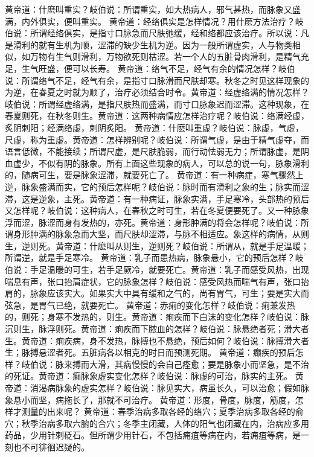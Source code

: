 \documentclass[a4paper,12pt,UTF8,twoside]{ctexbook}
\begin{document}
黄帝道：什麽叫重实？岐伯说：所谓重实，如大热病人，邪气甚热，而脉象又盛满，内外俱实，便叫重实。
黄帝道：经络俱实是怎样情况？用什麽方法治疗？岐伯说：所谓经络俱实，是指寸口脉急而尺肤弛缓，经和络都应该治疗。所以说：凡是滑利的就有生机为顺，涩滞的缺少生机为逆。因为一般所谓虚实，人与物类相似，如万物有生气则滑利，万物欲死则枯涩。若一个人的五脏骨肉滑利，是精气充足，生气旺盛，便可以长寿。
黄帝道：络气不足，经气有余的情况怎样？岐伯说：所谓络气不足，经气有余，是指寸口脉滑而尺肤却寒。秋冬之时见这样现象的为逆，在春夏之时就为顺了，治疗必须结合时令。黄帝道：经虚络满的情况怎样？岐伯说：所谓经虚络满，是指尺肤热而盛满，而寸口脉象迟而涩滞。这种现象，在春夏则死，在秋冬则生。黄帝道：这两种病情应怎样治疗呢？岐伯说：络满经虚，炙阴刺阳；经满络虚，刺阴炙阳。
黄帝道：什麽叫重虚？岐伯说：脉虚，气虚，尺虚，称为重虚。黄帝道：怎样辨别呢？岐伯说：所谓气虚，是由于精气虚夺，而语言低微，不能接续；所谓尺虚，是尺肤脆弱，而行动怯弱无力；所谓脉虚，是阴血虚少，不似有阴的脉象。所有上面这些现象的病人，可以总的说一句，脉象滑利的，随病可生，要是脉象涩滞，就要死亡了。
黄帝道：有一种病症，寒气骤然上逆，脉象盛满而实，它的预后怎样呢？岐伯说：脉时而有滑利之象的生；脉实而涩滞，这是逆象，主死。黄帝道：有一种病证，脉象实满，手足寒冷，头部热的预后又怎样呢？岐伯说：这种病人，在春秋之时可生，若在冬夏便要死了。又一种脉象浮而涩，脉涩而身有发热的，亦死。黄帝道：身形肿满的将会怎样呢？岐伯说：所谓身形肿满的脉象急而大坚，而尺肤却涩滞，与脉不相适应。象这样的病情，从则生，逆则死。黄帝道：什麽叫从则生，逆则死？岐伯说：所谓从，就是手足温暖；所谓逆，就是手足寒冷。
黄帝道：乳子而患热病，脉象悬小，它的预后怎样？岐伯说：手足温暖的可生，若手足厥冷，就要死亡。黄帝道：乳子而感受风热，出现喘息有声，张口抬肩症状，它的脉象怎样？岐伯说：感受风热而喘气有声，张口抬肩的，脉象应该实大。如果实大中具有缓和之气的，尚有胃气，可生；要是实大而弦急，是胃气已绝，就要死亡。
黄帝道：赤痢的变化怎样？岐伯说：痢兼发热的，则死；身寒不发热的，则生。黄帝道：痢疾而下白沫的变化怎样？岐伯说：脉沉则生，脉浮则死。黄帝道：痢疾而下脓血的怎样？岐伯说：脉悬绝者死；滑大者生。黄帝道：痢疾病，身不发热，脉搏也不悬绝，预后如何？岐伯说：脉搏滑大者生；脉搏悬涩者死。五脏病各以相克的时日而预测死期。
黄帝道：癫疾的预后怎样？岐伯说：脉来搏而大滑，其病慢慢的会自己痊愈；要是脉象小而坚急，是不治的死证。黄帝道：癫脉象虚实变化怎样？岐伯说：脉虚的可治，脉实的主死。
黄帝道：消渴病脉象的虚实怎样？岐伯说：脉见实大，病虽长久，可以治愈；假如脉象悬小而坚，病拖长了，那就不可治疗。
黄帝道：形度，骨度，脉度，筋度，怎样才测量的出来呢？
黄帝道：春季治病多取各经的络穴；夏季治病多取各经的俞穴；秋季治病多取六腑的合穴；冬季主闭藏，人体的阳气也闭藏在内，治病应多用药品，少用针刺砭石。但所谓少用针石，不包括痈疽等病在内，若痈疽等病，是一刻也不可徘徊迟疑的。
\end{document}
